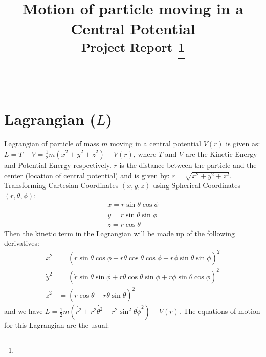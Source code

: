 \documentclass[conference]{IEEEtran}
\begin{document}
\title{Motion of particle moving in a Central Potential \\
{\footnotesize \textsuperscript{\LARGE{\textbf{Project Report}}}}
\thanks{}
}

\author{
\IEEEauthorblockN{} \\}

\maketitle

\section{\textbf{Lagrangian ($L$)}}
Lagrangian of particle of mass $m$ moving in a central potential $V(r)$ is given as: 
$ L = T - V  = \frac{1}{2} m\left(\dot{x}^{2}+\dot{y}^{2}+\dot{z}^{2}\right)-V(r) $, where $T$ and $V$ are the Kinetic Energy and Potential Energy respectively. $r$ is the distance between the particle and the center (location of central potential) and is given by: $r=\sqrt{x^{2}+y^{2}+z^{2}}$. Transforming Cartesian Coordinates $(x,y,z)$ using Spherical Coordinates $(r,\theta,\phi)$:
\begin{equation}
\begin{array}{l}
x=r \sin \theta \cos \phi \\
y=r \sin \theta \sin \phi \\
z=r \cos \theta
\end{array}
\end{equation}
Then the kinetic term in the Lagrangian will be made up of the following derivatives:
\begin{equation}
\begin{aligned}
\dot{x}^{2} &=(\dot{r} \sin \theta \cos \phi+r \dot{\theta} \cos \theta \cos \phi-r \dot{\phi} \sin \theta \sin \phi)^{2} \\
\dot{y}^{2} &=(\dot{r} \sin \theta \sin \phi+r \dot{\theta} \cos \theta \sin \phi+r \dot{\phi} \sin \theta \cos \phi)^{2} \\
\dot{z}^{2} &=(\dot{r} \cos \theta-r \dot{\theta} \sin \theta)^{2}
\end{aligned}
\end{equation}
and we have $L=\frac{1}{2} m\left(\dot{r^{2}}+r^{2} \dot{\theta^{2}}+r^{2} \sin ^{2} \theta{\dot \phi^{2}}\right)-V(r)$. The equations of motion for this Lagrangian are the usual:
\end{document}
